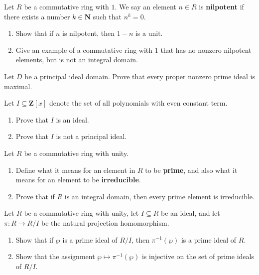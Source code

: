 \documentclass[11pt,twoside,openany]{memoir}
\begin{document}
    \begin{exercise}
    Let $R$ be a commutative ring with $1$. We say an element $n \in R$ is \textbf{nilpotent} if there exists a number $k \in \mathbf{N}$ such that $n^k = 0$.
    \begin{enumerate}[label = (\arabic*)]
        \item Show that if $n$ is nilpotent, then $1-n$ is a unit.
        \item Give an example of a commutative ring with $1$ that has no nonzero nilpotent elements, but is not an integral domain.
    \end{enumerate}
    \end{exercise}
    
    \begin{exercise}
    Let $D$ be a principal ideal domain. Prove that every proper nonzero prime ideal is maximal.
    \end{exercise}
    
    \begin{exercise}
    Let $I\subseteq \mathbf{Z}[x]$ denote the set of all polynomials with even constant term.
    \begin{enumerate}[label = (\arabic*)]
        \item Prove that $I$ is an ideal.
        \item Prove that $I$ is not a principal ideal.
    \end{enumerate}
    \end{exercise}
    
    \begin{exercise}
    Let $R$ be a commutative ring with unity.
    \begin{enumerate}[label = (\arabic*)]
        \item Define what it means for an element in $R$ to be \textbf{prime}, and also what it means for an element to be \textbf{irreducible}.
        \item Prove that if $R$ is an integral domain, then every prime element is irreducible.
    \end{enumerate}
    \end{exercise}
    
    \begin{exercise}
    Let $R$ be a commutative ring with unity, let $I\subseteq R$ be an ideal, and let $\pi:R\to R/I$ be the natural projection homomorphism.
    \begin{enumerate}[label = (\arabic*)]
        \item Show that if $\wp$ is a prime ideal of $R/I$, then $\pi^{-1}(\wp)$ is a prime ideal of $R$.
        \item Show that the assignment $\wp \mapsto \pi^{-1}(\wp)$ is injective on the set of prime ideals of $R/I$.
    \end{enumerate}
    \end{exercise}
    
\end{document}

